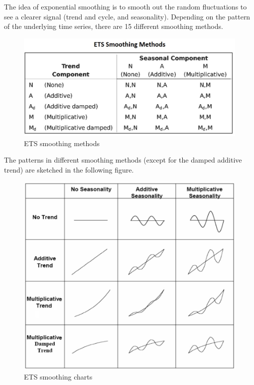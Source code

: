\documentclass[
]{book}
\begin{document}
The idea of exponential smoothing is to smooth out the random fluctuations to see a clearer signal (trend and cycle, and seasonality). Depending on the pattern of the underlying time series, there are 15 different smoothing methods.

\begin{figure}

{\centering \includegraphics[width=0.8\linewidth]{img13/w13-SmoothingMethodsChart} 

}

\caption{ETS smoothing methods}\label{fig:unnamed-chunk-236}
\end{figure}

The patterns in different smoothing methods (except for the damped additive trend) are sketched in the following figure.

\begin{figure}

{\centering \includegraphics[width=0.8\linewidth]{img13/w13-ETS-CommonSmoothingMethods} 

}

\caption{ETS smoothing charts}\label{fig:unnamed-chunk-237}
\end{figure}
\end{document}
